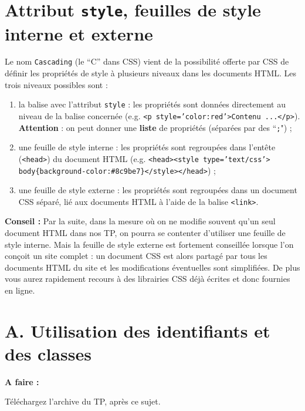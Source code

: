 \documentclass[a4paper,11pt]{article}
\begin{document}
\section{Attribut \texttt{style}, feuilles de style interne et externe}

Le nom \textcolor{rose}{\texttt{Cascading}} (le ``C'' dans CSS) vient de la possibilité offerte par CSS de définir les propriétés de style à plusieurs niveaux dans les documents HTML. Les trois niveaux possibles sont :

\begin{enumerate}
    \item la balise avec l'attribut \textcolor{rose}{\texttt{style}} : les propriétés sont données directement au niveau de la balise concernée (e.g. \textcolor{rose}{\texttt{<p style='color:red'>Contenu ...</p>}}).\\
    \textcolor{rougetitre}{\textbf{Attention}} : on peut donner une \textbf{liste} de propriétés (séparées par des ``\texttt{;}") ;
    \item une feuille de style interne : les propriétés sont regroupées dans l'entête (\texttt{<head>}) du document HTML (e.g. \textcolor{rose}{\texttt{<head><style type='text/css'> body\{background-color:\#8c9be7\}</style></head>}}) ;
    \item une feuille de style externe : les propriétés sont regroupées dans un document CSS séparé, lié aux documents HTML à l'aide de la balise \textcolor{rose}{\texttt{<link>}}.
\end{enumerate}

\textcolor{rougetitre}{\textbf{Conseil :}} Par la suite, dans la mesure où on ne modifie souvent qu'un seul document HTML dans nos TP, on pourra se contenter d'utiliser une feuille de style interne. Mais la feuille de style externe est fortement conseillée lorsque l'on conçoit un site complet : un document CSS est alors partagé par tous les documents HTML du site et les modifications éventuelles sont simplifiées. De plus vous aurez rapidement recours à des librairies CSS déjà écrites et donc fournies en ligne.

\section{A. Utilisation des identifiants et des classes}

\begin{afaire}
\textbf{A faire :}

Téléchargez l'archive du TP, après ce sujet.
\end{afaire}
\end{document}
